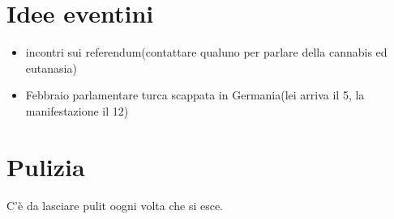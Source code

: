 \documentclass{article}
\begin{document}
    \section{Idee eventini}
    \begin{itemize}
        \item incontri sui referendum(contattare qualuno per parlare della cannabis ed eutanasia)
        \item Febbraio parlamentare turca scappata in Germania(lei arriva il 5, la manifestazione il 12)
    \end{itemize}


    
    \section{Pulizia}
    C'è da lasciare pulit oogni volta che si esce.
\end{document}
